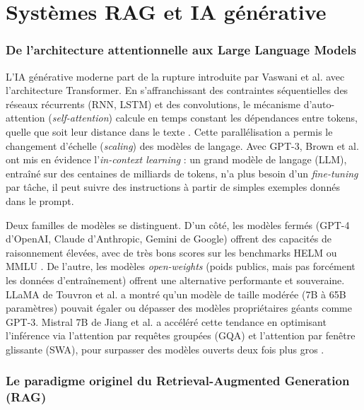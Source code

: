 \section{Systèmes RAG et IA générative}
\label{sec:Systemes_RAG_IA_Generative}

\subsubsection{De l'architecture attentionnelle aux Large Language Models}

L'IA générative moderne part de la rupture introduite par Vaswani et al. \cite{vaswaniAttentionAllYou2017} avec l'architecture Transformer. En s'affranchissant des contraintes séquentielles des réseaux récurrents (RNN, LSTM) et des convolutions, le mécanisme d'auto-attention (\textit{self-attention}) calcule en temps constant les dépendances entre tokens, quelle que soit leur distance dans le texte \cite{vaswaniAttentionAllYou2017}. Cette parallélisation a permis le changement d'échelle (\textit{scaling}) des modèles de langage. Avec GPT-3, Brown et al. \cite{brownLanguageModelsAre2020} ont mis en évidence l'\textit{in-context learning} : un grand modèle de langage (LLM), entraîné sur des centaines de milliards de tokens, n'a plus besoin d'un \textit{fine-tuning} par tâche, il peut suivre des instructions à partir de simples exemples donnés dans le prompt.

Deux familles de modèles se distinguent. D'un côté, les modèles fermés (GPT-4 d'OpenAI, Claude d'Anthropic, Gemini de Google) offrent des capacités de raisonnement élevées, avec de très bons scores sur les benchmarks HELM ou MMLU \cite{touvronLlamaOpenEfficient2023}. De l'autre, les modèles \textit{open-weights} (poids publics, mais pas forcément les données d'entraînement) offrent une alternative performante et souveraine. LLaMA de Touvron et al. \cite{touvronLlamaOpenEfficient2023} a montré qu'un modèle de taille modérée (7B à 65B paramètres) pouvait égaler ou dépasser des modèles propriétaires géants comme GPT-3. Mistral 7B de Jiang et al. \cite{fix_jiangMistral7B2023} a accéléré cette tendance en optimisant l'inférence via l'attention par requêtes groupées (GQA) et l'attention par fenêtre glissante (SWA), pour surpasser des modèles ouverts deux fois plus gros \cite{fix_jiangMistral7B2023}.

\subsubsection{Le paradigme originel du Retrieval-Augmented Generation (RAG)}

